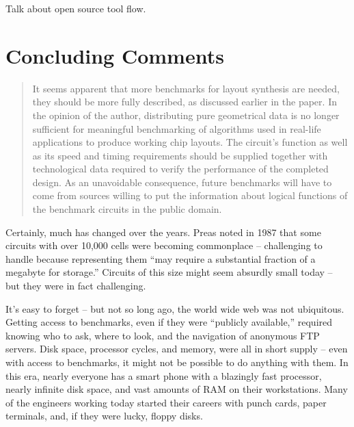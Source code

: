 \documentclass[sigconf]{acmart}
\begin{document}
Talk about open source tool flow.  

\cite{Ajayi19}




\section{Concluding Comments}

\begin{quote}
It seems apparent that more benchmarks for layout synthesis are
needed, they should be more fully described, as discussed earlier in
the paper. In the opinion of the author, distributing pure
geometrical data is no longer sufficient for meaningful benchmarking
of algorithms used in real-life applications to produce working chip
layouts. The circuit's function as well as its speed and timing
requirements should be supplied together with technological data
required to verify the performance of the completed design. As an
unavoidable consequence, future benchmarks will have to come from
sources willing to put the information about logical functions of the
benchmark circuits in the public domain.
\end{quote}


Certainly, much has changed over the years.  Preas\cite{Preas87}
noted in 1987 that some circuits with over 10,000 cells were becoming
commonplace -- challenging to handle because representing them
``may require a substantial fraction of a megabyte for storage.''
Circuits of this size might seem absurdly small today -- but they
were in fact challenging.

It's easy to forget -- but not so long ago, the
world wide web was not ubiquitous. Getting access to benchmarks, even if they
were ``publicly available,'' required knowing who to ask, where to
look, and the navigation of anonymous FTP servers.  Disk space,
processor cycles, and memory, were all in short supply -- even with
access to benchmarks, it might not be possible to do anything with them.
In this era, nearly everyone has a smart phone with a blazingly fast
processor, nearly infinite disk space, and vast amounts of
RAM on their workstations.  Many of the engineers
working today started their careers with punch cards,
paper terminals, and, if they were lucky, floppy disks.



\balance


\end{document}
